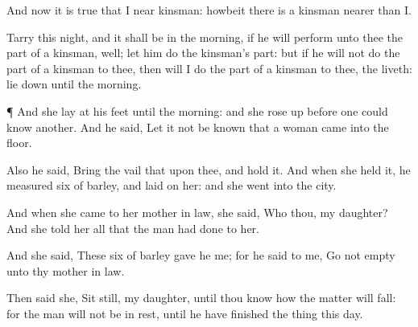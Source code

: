 {And now it is
true that I
{} near
kinsman: howbeit there
is a
kinsman
nearer than I.

Tarry this
night, and it shall be in the
morning,
{} if he will perform unto thee the part of a
kinsman,
well; let him do the
kinsman’s part: but if he
will not do the part of a
kinsman to thee, then will I do the part of a
kinsman to thee,
{} the
{}
liveth: lie
down until the
morning.


\par }{\PP {}¶ And she
lay at his
feet until the
morning: and she rose
up
before
one could
know
another. And he
said, Let it not be
known that a
woman
came into the
floor.

Also he
said,
Bring the
vail that
{} upon thee, and
hold it. And when she
held it, he
measured
six
{} of
barley, and
laid
{} on her: and she
went into the
city.

And when she
came to her mother in
law, she
said, Who
{} thou, my
daughter? And she
told her all that the
man had
done to her.

And she
said, These
six
{} of
barley
gave he me; for he
said to me,
Go not
empty unto thy mother in
law.

Then
said she, Sit
still, my
daughter, until thou
know how the
matter will
fall: for the
man will not be in
rest,
until he have
finished the
thing this
day.




\par }
